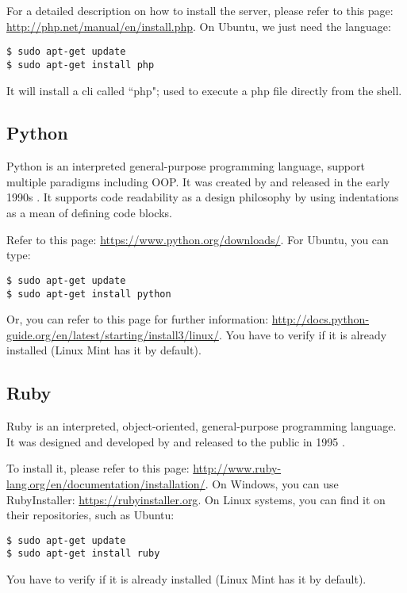 \documentclass{KodeBook}
\begin{document}
For a detailed description on how to install the server, please refer to this page: \url{http://php.net/manual/en/install.php}.
On Ubuntu, we just need the language:
\begin{lstlisting}[style=shellStyle]
$ sudo apt-get update
$ sudo apt-get install php
\end{lstlisting}
It will install a \ac{cli} called ``php"; used to execute a php file directly from the shell.

\subsection{Python}


Python is an interpreted general-purpose programming language, support multiple paradigms including OOP. 
It was created by  and released in the early 1990s \cite{2018-python2.7}.
It supports code readability as a design philosophy by using indentations as a mean of defining code blocks.

Refer to this page: \url{https://www.python.org/downloads/}. 
For Ubuntu, you can type:
\begin{lstlisting}[style=shellStyle]
$ sudo apt-get update
$ sudo apt-get install python
\end{lstlisting}
Or, you can refer to this page for further information: \url{http://docs.python-guide.org/en/latest/starting/install3/linux/}.
You have to verify if it is already installed (Linux Mint has it by default).

\subsection{Ruby}


Ruby is an interpreted, object-oriented, general-purpose programming language. 
It was designed and developed by  and released to the public in 1995 \citep{2001-thomas-hunt}.

To install it, please refer to this page: \url{http://www.ruby-lang.org/en/documentation/installation/}. 
On Windows, you can use RubyInstaller: \url{https://rubyinstaller.org}.
On Linux systems, you can find it on their repositories, such as Ubuntu:
\begin{lstlisting}[style=shellStyle]
$ sudo apt-get update
$ sudo apt-get install ruby
\end{lstlisting}
You have to verify if it is already installed (Linux Mint has it by default).
\end{document}

